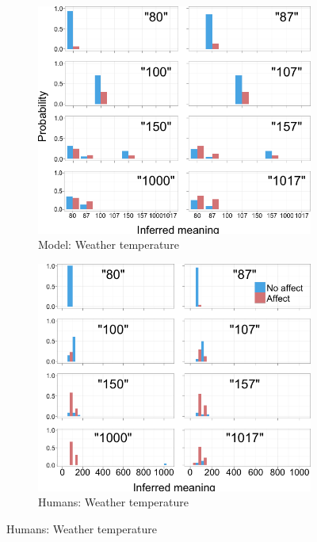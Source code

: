 \documentclass{article} %
\begin{document}
\begin{figure}[H]
        \begin{subfigure}[b]{0.51\textwidth}
                \centering
                \caption{Model: Weather temperature}
                \includegraphics[width=\textwidth]{model_weather_all.png}
	\end{subfigure}
        \begin{subfigure}[b]{0.51\textwidth}
                \centering
                \caption{Humans: Weather temperature}
                \includegraphics[width=\textwidth]{humans_weather_all.png}
        \end{subfigure}
	


\end{figure}
\end{document}
